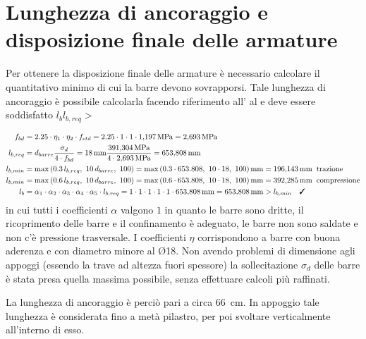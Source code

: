\section{Lunghezza di ancoraggio e disposizione finale delle armature}
Per ottenere la disposizione finale delle armature è necessario calcolare il quantitativo minimo di cui la barre devono sovrapporsi.
Tale lunghezza di ancoraggio è possibile calcolarla facendo riferimento all' al  e deve essere soddisfatto $l_b l_{b,req}> $

\[
\begin{split}
f_{bd} 
&= 2.25 \cdot \eta_{1} \cdot \eta_{2} \cdot f_{ctd}  
= 2.25 \cdot 1 \cdot 1 \cdot \SI{1.197}{\mega\pascal} 
= \SI{2.693}{\mega\pascal}  
\\
l_{b,req} 
&= d_{barre} \frac{ \sigma_{d} }{ 4 \cdot f_{bd} }  
= \SI{18}{\milli\metre}  \frac{ \SI{391.304}{\mega\pascal} }{ 4 \cdot \SI{2.693}{\mega\pascal} } 
= \SI{653.808}{\milli\metre}  
\\
l_{b,min} 
&= 
\max { \left( 0.3 \, l_{b,req} ,\  10 \, d_{barre} ,\  100 \right) }  
= \max { \left( 0.3 \cdot 653.808 ,\  10 \cdot 18 ,\  100 \right) } \,\si{\milli\metre}
= \SI{196.143}{\milli\metre} \; \;\textrm{trazione}
\\
l_{b,min} 
&= \max { \left( 0.6 \, l_{b,req} ,\  10 \, d_{barre} ,\  100 \right) }  
= \max { \left( 0.6 \cdot 653.808 ,\  10 \cdot 18 ,\  100 \right) } \,\si{\milli\metre}
= \SI{392.285}{\milli\metre} \; \;\textrm{compressione}
\\
l_{b} 
&= \alpha_{1} \cdot \alpha_{2} \cdot \alpha_{3} \cdot \alpha_{4} \cdot \alpha_{5} \cdot l_{b,req}  
= 1 \cdot 1 \cdot 1 \cdot 1 \cdot 1 \cdot \SI{653.808}{\milli\metre} 
= \SI{653.808}{\milli\metre} > l_{b,min} \quad \checked
\end{split}
\]
in cui tutti i coefficienti $\alpha$ valgono $1$ in quanto le barre sono dritte, il ricoprimento delle barre e il confinamento è adeguato, le barre non sono saldate e non c'è pressione trasversale.
I coefficienti $\eta$ corrispondono a barre con buona aderenza e con diametro minore al Ø18.
Non avendo problemi di dimensione agli appoggi (essendo la trave ad altezza fuori spessore) la sollecitazione $\sigma_{d}$ delle barre è stata presa quella massima possibile, senza effettuare calcoli più raffinati.

La lunghezza di ancoraggio è perciò pari a circa \SI{66}{\centi\metre}.
In appoggio tale lunghezza è considerata fino a metà pilastro, per poi svoltare verticalmente all'interno di esso.

